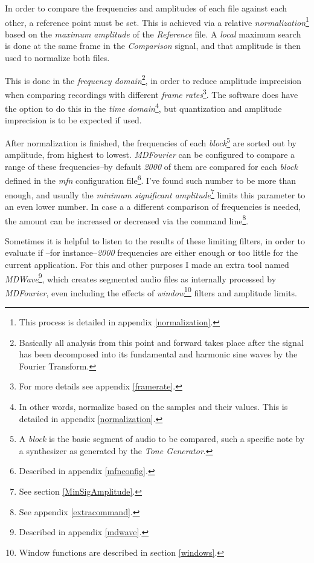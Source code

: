 \documentclass[10pt,a4paper]{report}
\begin{document}
In order to compare the frequencies and amplitudes of each file against each other, a reference point must be set. This is achieved via a relative \textit{normalization}\footnote{This process is detailed in appendix \ref{normalization}.} based on the \textit{maximum amplitude} of the \textit{Reference} file. A \textit{local} maximum search is done at the same frame in the \textit{Comparison} signal, and that amplitude is then used to normalize both files. 

This is done in the \textit{frequency domain}\footnote{Basically all analysis from this point and forward takes place after the signal has been decomposed into its fundamental and harmonic sine waves by the Fourier Transform.}, in order to reduce amplitude imprecision when comparing recordings with different \textit{frame rates}\footnote{For more details see appendix \ref{framerate}.}. The software does have the option to do this in the \textit{time domain}\footnote{In other words, normalize based on the samples and their values. This is detailed in appendix \ref{normalization}.}, but quantization and amplitude imprecision is to be expected if used.

After normalization is finished, the frequencies of each \textit{block}\footnote{A \textit{block} is the basic segment of audio to be compared, such a specific note by a synthesizer as generated by the \textit{Tone Generator}.} are sorted out by amplitude, from highest to lowest. \textit{MDFourier} can be configured to compare a range of these frequencies--by default \textit{2000} of them are compared for each \textit{block} defined in the \textit{mfn} configuration file\footnote{Described in appendix \ref{mfnconfig}.}. I've found such number to be more than enough, and usually the \textit{minimum significant amplitude}\footnote{See section \ref{MinSigAmplitude}.} limits this parameter to an even lower number. In case a a different comparison of frequencies is needed, the amount can be increased or decreased via the command line\footnote{See appendix \ref{extracommand}.}.

Sometimes it is helpful to listen to the results of these limiting filters, in order to evaluate if --for instance--\textit{2000} frequencies are either enough or too little for the current application. For this and other purposes I made an extra tool named \textit{MDWave}\footnote{Described in appendix \ref{mdwave}.}, which creates segmented audio files as internally processed by \textit{MDFourier}, even including the effects of \textit{window}\footnote{Window functions are described in section \ref{windows}.} filters and amplitude limits.
\end{document}

